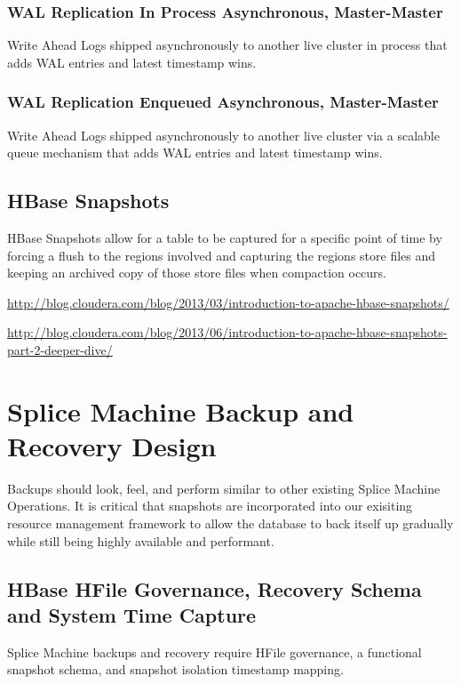 \subsubsection{WAL Replication In Process Asynchronous, Master-Master}

Write Ahead Logs shipped asynchronously to another live cluster in process that
adds WAL entries and latest timestamp wins.

\subsubsection{WAL Replication Enqueued Asynchronous, Master-Master}

Write Ahead Logs shipped asynchronously to another live cluster via a scalable
queue mechanism that adds WAL entries and latest timestamp wins.


\subsection{HBase Snapshots}

HBase Snapshots allow for a table to be captured for a specific point of time
by forcing a flush to the regions involved and capturing the regions store
files and keeping an archived copy of those store files when compaction occurs. 

\url{http://blog.cloudera.com/blog/2013/03/introduction-to-apache-hbase-snapshots/}

\url{http://blog.cloudera.com/blog/2013/06/introduction-to-apache-hbase-snapshots-part-2-deeper-dive/}

\section{Splice Machine Backup and Recovery Design}

Backups should look, feel, and perform similar to other existing Splice Machine
Operations.  It is critical that snapshots are incorporated into our exisiting
resource management framework to allow the database to back itself up gradually
while still being highly available and performant.

\subsection{HBase HFile Governance, Recovery Schema and System Time Capture}

Splice Machine backups and recovery require HFile governance, a functional
snapshot schema, and snapshot isolation timestamp mapping.

